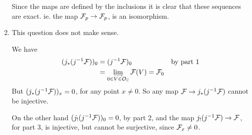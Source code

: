 \documentclass[a4paper,11pt,english]{article}
\begin{document}
\begin{exercise}[3]
\begin{enumerate}
Since the maps are defined by the inclusions it is clear that these sequences are
exact. ie. the map $\mathcal{F}_p \to \mathcal{F}_p$, is an isomorphism.

\item %
This question does not make sense.

We have
\begin{align*}
(j_*(j\i\F))_0 &= (j\i\F)_0 && \text{by part 1} \\
&= \colim_{0 \in V \in \O_\C} \F(V) = \F_0
\end{align*}
But $(j_*(j^{-1}\mathcal{F}))_x = 0$, for any point $x \ne 0$. So any map 
$\mathcal{F} \to j_*(j^{-1}\mathcal{F})$ cannot be injective.


On the other hand $(j_!(j^{-1}\mathcal{F}))_0 = 0$, by part 2, and the map 
$j_!(j^{-1}\mathcal{F}) \to \mathcal{F}$, for part 3, is injective, but cannot be surjective,
since $\mathcal{F}_x \ne 0$.


\end{enumerate}

\end{exercise}
\end{document}
